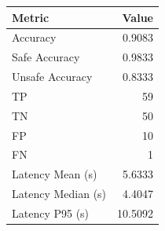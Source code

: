 \begin{table}[ht]
\centering
\begin{tabular}{lr}
\toprule
Metric & Value \\
\midrule
Accuracy & 0.9083 \\
Safe Accuracy & 0.9833 \\
Unsafe Accuracy & 0.8333 \\
TP & 59 \\
TN & 50 \\
FP & 10 \\
FN & 1 \\
Latency Mean (s) & 5.6333 \\
Latency Median (s) & 4.4047 \\
Latency P95 (s) & 10.5092 \\
\bottomrule
\end{tabular}
\end{table}